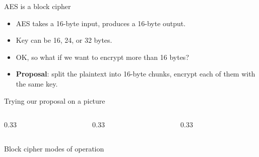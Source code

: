 \ifdefined\PRESENTATION\else\PassOptionsToClass{handout}{beamer}\fi\documentclass[aspectratio=169, lualatex]{beamer}
\begin{document}
\begin{frame}{AES is a block cipher}
	\begin{itemize}[<+->]
		\item AES takes a 16-byte input, produces a 16-byte output.
		\item Key can be 16, 24, or 32 bytes.
		\item OK, so what if we want to encrypt more than 16 bytes?
		\item \textbf{Proposal}: split the plaintext into 16-byte chunks, encrypt
		      each of them with the same key.
	\end{itemize}
\end{frame}

\begin{frame}{Trying our proposal on a picture}
	\begin{columns}
		\begin{column}{0.33\textwidth}
		\end{column}
		\pause
		\begin{column}{0.33\textwidth}
		\end{column}
		\pause
		\begin{column}{0.33\textwidth}
		\end{column}
	\end{columns}
\end{frame}

\begin{frame}{Block cipher modes of operation}
\end{frame}
\end{document}

